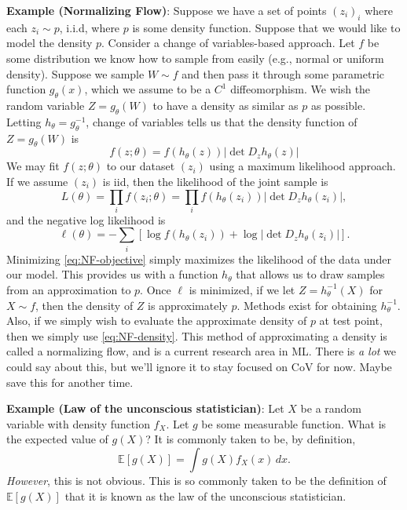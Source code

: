 \documentclass{book}
\newcommand{\dx}{\, dx}
\newcommand{\E}{\mathbb{E}}
\begin{document}
\vspace{1em} \noindent 
\textbf{Example (Normalizing Flow)}: Suppose we have a set of points $(z_i)_i $ where each $z_i \sim p$, i.i.d, where $p$ is some density function. Suppose that we would like to model the density $p$. Consider a change of variables-based approach. Let $f$ be some distribution we know how to sample from easily (e.g., normal or uniform density). Suppose we sample $W\sim f$ and then pass it through some parametric function $g_\theta(x)$, which we assume to be a $C^1$ diffeomorphism. We wish the random variable $Z=g_\theta(W)$ to have a density as similar as $p$ as possible. Letting $h_\theta = g_\theta^{-1}$, change of variables tells us that the density function of $Z=g_\theta(W)$ is
\begin{equation} \label{eq:NF-density}
f(z;\theta) = f(h_\theta(z)) |\det D_z h_\theta(z)| 
\end{equation}
We may fit $f(z; \theta)$ to our dataset $(z_i)$ using a maximum likelihood approach. If we assume $(z_i)$ is iid, then the likelihood of the joint sample is
\begin{equation} 
L(\theta) = \prod_i f(z_i; \theta)  = \prod_i f(h_\theta(z_i)) |\det D_z h_\theta(z_i)|,
\end{equation}
and the negative log likelihood is
\begin{equation} \label{eq:NF-objective}
\ell(\theta) = -\sum_i \left[ \log f(h_\theta(z_i))  + \log |\det D_z h_\theta(z_i)| \right].
\end{equation}
Minimizing \eqref{eq:NF-objective} simply maximizes the likelihood of the data under our model. This provides us with a function $h_\theta$ that allows us to draw samples from an approximation to $p$. Once $\ell$ is minimized, if we let $Z = h^{-1}_\theta(X)$ for $X\sim f$, then the density of $Z$ is approximately $p$. Methods exist for obtaining $h^{-1}_\theta$. Also, if we simply wish to evaluate the approximate density of $p$ at test point, then we simply use \eqref{eq:NF-density}. This method of approximating a density is called a normalizing flow, and is a current research area in ML. There is \emph{a lot} we could say about this, but we'll ignore it to stay focused on CoV for now. Maybe save this for another time.

\vspace{1em} \noindent
\textbf{Example (Law of the unconscious statistician)}: Let $X$ be a random variable with density function $f_X$. Let $g$ be some measurable function. What is the expected value of $g(X)$? It is commonly taken to be, by definition,
\begin{equation} \label{eq:LOTUS}
\E[g(X)] = \int g(X) f_X(x)\dx. 
\end{equation}
\emph{However}, this is not obvious. This is so commonly taken to be the definition of $\E[g(X)]$ that it is known as the law of the unconscious statistician. 
\end{document}
